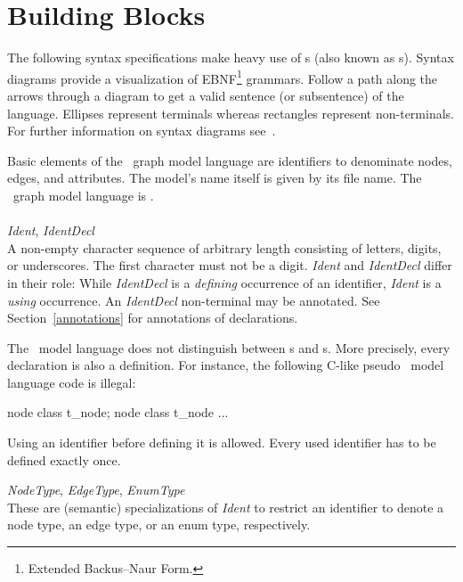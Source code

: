\section{Building Blocks}
\label{modelbb}

\begin{note}
The following syntax specifications make heavy use of s (also known as s).
Syntax diagrams provide a visualization of EBNF\footnote{Extended Backus–Naur Form.} grammars.
Follow a path along the arrows through a diagram to get a valid sentence (or subsentence) of the language.
Ellipses represent terminals whereas rectangles represent non-terminals. For further information on syntax diagrams see~\cite{MMJW:91}.
\end{note}
Basic elements of the \GrG\ graph model language are identifiers to denominate nodes, edges, and attributes.
The model's name itself is given by its file name.
The \GrG\ graph model language is .\\
\\
\emph{Ident}, \emph{IdentDecl}\\ \nopagebreak
A non-empty character sequence of arbitrary length consisting of letters, digits, or underscores.
The first character must not be a digit. \emph{Ident} and \emph{IdentDecl} differ in their role:
While \emph{IdentDecl} is a \emph{defining} occurrence of an identifier, \emph{Ident} is a \emph{using} occurrence.
An \emph{IdentDecl} non-terminal may be annotated. See Section~\ref{annotations} for annotations of declarations.
\begin{note}
\label{note:modeldecl}
  The \GrG\ model language does not distinguish between s and s. More precisely, every declaration is also a definition. For instance, the following C-like pseudo \GrG\ model language code is illegal:
\begin{grgen}
node class t_node;
node class t_node {
  ...
}
\end{grgen}
Using an identifier before defining it is allowed. Every used identifier has to be defined exactly once.
\end{note}
\pagebreak
\emph{NodeType}, \emph{EdgeType}, \emph{EnumType}\\ \nopagebreak
These are (semantic) specializations of \emph{Ident} to restrict an identifier to denote a node type, an edge type, or an enum type, respectively.

